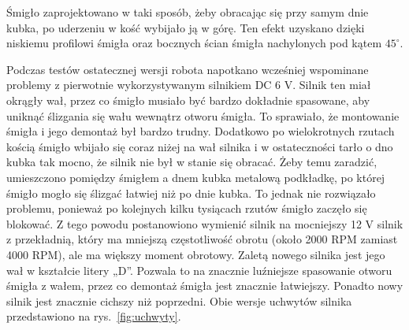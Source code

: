 Śmigło zaprojektowano w taki sposób, żeby obracając się przy samym dnie kubka, po uderzeniu w kość wybijało ją w górę. Ten efekt uzyskano
dzięki niskiemu profilowi śmigła oraz bocznych ścian śmigła nachylonych pod kątem $45^{\circ}$.

Podczas testów ostatecznej wersji robota napotkano wcześniej wspominane problemy z pierwotnie wykorzystywanym silnikiem DC 6 V. Silnik ten miał okrągły wał, przez co śmigło musiało
być bardzo dokładnie spasowane, aby uniknąć ślizgania się wału wewnątrz otworu śmigła. To sprawiało, że montowanie śmigła i jego demontaż był bardzo trudny. Dodatkowo po wielokrotnych rzutach kością śmigło
wbijało się coraz niżej na wał silnika i w ostateczności tarło o dno kubka tak mocno, że silnik nie był w stanie się obracać. 
Żeby temu zaradzić, umieszczono pomiędzy śmigłem a dnem kubka metalową podkładkę, po której śmigło mogło się ślizgać łatwiej niż po dnie kubka. To
jednak nie rozwiązało problemu, ponieważ po kolejnych kilku tysiącach rzutów śmigło zaczęło się blokować. 
Z tego powodu postanowiono wymienić silnik na mocniejszy 12 V silnik z przekładnią, który ma mniejszą częstotliwość obrotu (około 2000 RPM zamiast 4000 RPM), ale ma większy moment obrotowy.
Zaletą nowego silnika jest jego wał w kształcie litery „D”. Pozwala to na znacznie luźniejsze spasowanie otworu śmigła z wałem, przez co
demontaż śmigła jest znacznie łatwiejszy. Ponadto nowy silnik jest znacznie cichszy niż poprzedni. Obie wersje uchwytów silnika przedstawiono na rys.~\ref{fig:uchwyty}.


